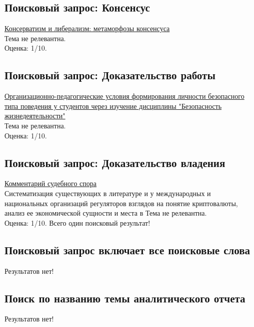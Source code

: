 \documentclass[a4paper, 12pt]{report}		%
\begin{document}
\subsection*{Поисковый запрос: Консенсус}

\href{https://ruslan.library.spbstu.ru/pwb/detail?db=ANALITS2005&id=RU%5CSPSTU%5Canalits2005%5C10209}{Консерватизм и либерализм: метаморфозы консенсуса}\\
Тема не релевантна.\\
Оценка: 1/10.

\subsection*{Поисковый запрос: Доказательство работы}

\href{https://ruslan.library.spbstu.ru/pwb/detail?db=ANALITS2005&id=RU%5CSPSTU%5Canalits2005%5C385225}{Организационно-педагогические условия формирования личности безопасного типа поведения у студентов через изучение дисциплины "Безопасность жизнедеятельности"}\\
Тема не релевантна.\\
Оценка: 1/10.

\subsection*{Поисковый запрос: Доказательство владения}

\href{https://ruslan.library.spbstu.ru/pwb/detail?db=ANALITS2005&id=RU%5CSPSTU%5Canalits2009%5C42785}{Комментарий судебного спора}\\
Систематизация существующих в литературе и у международных и национальных организаций регуляторов взглядов на понятие криптовалюты, анализ ее экономической сущности и места в Тема не релевантна.\\
Оценка: 1/10.
Всего один поисковый результат!

\subsection*{Поисковый запрос включает все поисковые слова}

Результатов нет!

\subsection*{Поиск по названию темы аналитического отчета}

Результатов нет!
\end{document}
